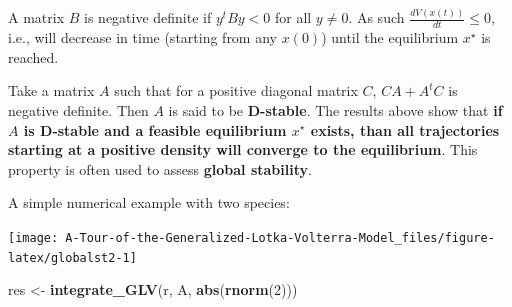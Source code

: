 \documentclass[]{book}
\newenvironment{Shaded}{\begin{snugshade}}{\end{snugshade}}
\newcommand{\CommentTok}[1]{\textcolor[rgb]{0.56,0.35,0.01}{\textit{#1}}}
\newcommand{\DecValTok}[1]{\textcolor[rgb]{0.00,0.00,0.81}{#1}}
\newcommand{\KeywordTok}[1]{\textcolor[rgb]{0.13,0.29,0.53}{\textbf{#1}}}
\newcommand{\NormalTok}[1]{#1}
\newcommand{\OperatorTok}[1]{\textcolor[rgb]{0.81,0.36,0.00}{\textbf{#1}}}
\newcommand{\StringTok}[1]{\textcolor[rgb]{0.31,0.60,0.02}{#1}}
\begin{document}
A matrix \(B\) is negative definite if \(y^t B y < 0\) for all \(y \neq 0\). As such \(\frac{d V(x(t))}{dt} \leq 0\), i.e., will decrease in time (starting from any \(x(0)\)) until the equilibrium \(x^\star\) is reached.

Take a matrix \(A\) such that for a positive diagonal matrix \(C\), \(CA + A^tC\) is negative definite. Then \(A\) is said to be \textbf{D-stable}. The results above show that \textbf{if \(A\) is D-stable and a feasible equilibrium \(x^\star\) exists, than all trajectories starting at a positive density will converge to the equilibrium}. This property is often used to assess \textbf{global stability}.

A simple numerical example with two species:

\begin{Shaded}
\end{Shaded}

\begin{center}\texttt{[image: A-Tour-of-the-Generalized-Lotka-Volterra-Model\_files/figure-latex/globalst2-1]} \end{center}

\begin{Shaded}
\begin{Highlighting}[]
\NormalTok{res <-}\StringTok{ }\KeywordTok{integrate_GLV}\NormalTok{(r, A, }\KeywordTok{abs}\NormalTok{(}\KeywordTok{rnorm}\NormalTok{(}\DecValTok{2}\NormalTok{)))}
\end{Highlighting}
\end{Shaded}
\end{document}
